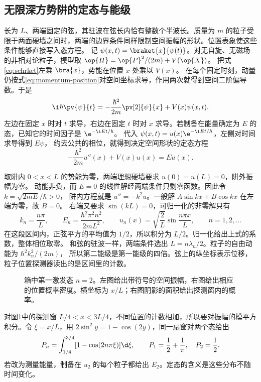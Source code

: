 \subsection{无限深方势阱的定态与能级}
\label{ss:position-well}
长为 $L$、两端固定的弦，其驻波在弦长内恰有整数个半波长。质量为 $m$ 的粒子受限于两面硬墙之间时，两端的边界条件同样限制空间振幅的形状。位置表象使这些条件能够直接写入态方程。
记 $\psi(x,t)=\braket{x}{\psi(t)}$。对无自旋、无磁场的非相对论粒子，模型取 $\op{H}=\op{P}^2/(2m)+V(\op{X})$。
把式\eqref{eq:schrket}左乘 $\bra{x}$，势能在位置 $x$ 处乘以 $V(x)$。
在每个固定时刻，动量仍按式\eqref{eq:momentum-position}对空间坐标求导，作用两次就得到空间二阶偏导数。于是
\begin{equation}
    \i\hbar\pv{\psi}{t}
    =-\frac{\hbar^2}{2m}\pv[2]{\psi}{x}+V(x)\psi(x,t).
    \label{eq:position-schrodinger}
\end{equation}
左边在固定 $x$ 时对 $t$ 求导，右边在固定 $t$ 时对 $x$ 求导。若制备在能量确定为 $E$ 的态，已知它的时间因子是 $\e^{-\i Et/\hbar}$。
代入 $\psi(x,t)=u(x)\e^{-\i Et/\hbar}$，左侧对时间求导得到 $E\psi$，
约去公共的相位，就得到决定空间形状的定态方程
\begin{equation}
    -\frac{\hbar^2}{2m}u''(x)+V(x)u(x)=Eu(x).
    \label{eq:position-stationary}
\end{equation}

取阱内 $0<x<L$ 的势能为零，两端理想硬墙要求 $u(0)=u(L)=0$，阱外振幅为零。
动能非负，而 $E=0$ 的线性解经两端条件只剩零函数。因此令 $k=\sqrt{2mE}/\hbar>0$，
阱内方程就是 $u''=-k^2u$。一般解 $A\sin kx+B\cos kx$ 在左端为零，故 $B=0$。
右端又要求 $\sin(kL)=0$，可归一化的非零解只有
\begin{equation}
    k_n=\frac{n\pi}{L},\qquad
    E_n=\frac{\hbar^2\pi^2n^2}{2mL^2},\qquad
    u_n(x)=\sqrt{\frac{2}{L}}\sin\frac{n\pi x}{L},
    \qquad n=1,2,\ldots
\end{equation}
在这段区间内，正弦平方的平均值为 $1/2$，所以积分为 $L/2$。归一化给出上式的系数，整体相位取零。
和弦的驻波一样，两端条件选出 $L=n\lambda_n/2$。粒子的自由动能为 $\hbar^2k_n^2/(2m)$，
所以第二能级是第一能级的四倍。弦上的纵坐标表示位移，粒子位置探测器读出的是区间里的计数。

\begin{figure}[htbp]
    \centering
    \caption{箱中第一激发态 $n=2$。左图给出带符号的空间振幅，右图给出相应的位置概率密度。横坐标为 $x/L$；右图阴影的面积给出探测窗内的概率。}
    \label{fig:well-detection}
\end{figure}
对图\ref{fig:well-detection}中的探测窗 $L/4<x<3L/4$，不同位置的计数相加，所以要对振幅的模平方积分。令 $\xi=x/L$，用 $2\sin^2 y=1-\cos(2y)$，同一扇窗对两个态给出
\begin{equation}
    P_n=\int_{1/4}^{3/4}[1-\cos(2n\pi\xi)]\d\xi,\qquad
    P_1=\frac12+\frac1\pi,\quad P_2=\frac12 .
\end{equation}
若改为测量能量，制备在 $u_2$ 的每个粒子都给出 $E_2$。定态的含义是这些分布不随时间变化。

